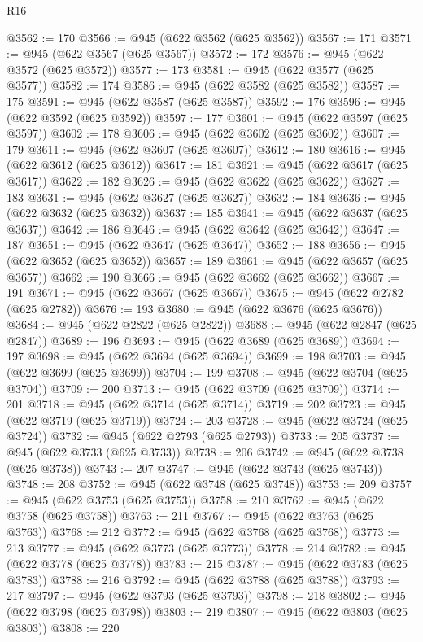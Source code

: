\begin{lexlean}{R16}
\begin{coremodule}
@3562 := 170
@3566 := @945 (@622 @3562 (@625 @3562))
@3567 := 171
@3571 := @945 (@622 @3567 (@625 @3567))
@3572 := 172
@3576 := @945 (@622 @3572 (@625 @3572))
@3577 := 173
@3581 := @945 (@622 @3577 (@625 @3577))
@3582 := 174
@3586 := @945 (@622 @3582 (@625 @3582))
@3587 := 175
@3591 := @945 (@622 @3587 (@625 @3587))
@3592 := 176
@3596 := @945 (@622 @3592 (@625 @3592))
@3597 := 177
@3601 := @945 (@622 @3597 (@625 @3597))
@3602 := 178
@3606 := @945 (@622 @3602 (@625 @3602))
@3607 := 179
@3611 := @945 (@622 @3607 (@625 @3607))
@3612 := 180
@3616 := @945 (@622 @3612 (@625 @3612))
@3617 := 181
@3621 := @945 (@622 @3617 (@625 @3617))
@3622 := 182
@3626 := @945 (@622 @3622 (@625 @3622))
@3627 := 183
@3631 := @945 (@622 @3627 (@625 @3627))
@3632 := 184
@3636 := @945 (@622 @3632 (@625 @3632))
@3637 := 185
@3641 := @945 (@622 @3637 (@625 @3637))
@3642 := 186
@3646 := @945 (@622 @3642 (@625 @3642))
@3647 := 187
@3651 := @945 (@622 @3647 (@625 @3647))
@3652 := 188
@3656 := @945 (@622 @3652 (@625 @3652))
@3657 := 189
@3661 := @945 (@622 @3657 (@625 @3657))
@3662 := 190
@3666 := @945 (@622 @3662 (@625 @3662))
@3667 := 191
@3671 := @945 (@622 @3667 (@625 @3667))
@3675 := @945 (@622 @2782 (@625 @2782))
@3676 := 193
@3680 := @945 (@622 @3676 (@625 @3676))
@3684 := @945 (@622 @2822 (@625 @2822))
@3688 := @945 (@622 @2847 (@625 @2847))
@3689 := 196
@3693 := @945 (@622 @3689 (@625 @3689))
@3694 := 197
@3698 := @945 (@622 @3694 (@625 @3694))
@3699 := 198
@3703 := @945 (@622 @3699 (@625 @3699))
@3704 := 199
@3708 := @945 (@622 @3704 (@625 @3704))
@3709 := 200
@3713 := @945 (@622 @3709 (@625 @3709))
@3714 := 201
@3718 := @945 (@622 @3714 (@625 @3714))
@3719 := 202
@3723 := @945 (@622 @3719 (@625 @3719))
@3724 := 203
@3728 := @945 (@622 @3724 (@625 @3724))
@3732 := @945 (@622 @2793 (@625 @2793))
@3733 := 205
@3737 := @945 (@622 @3733 (@625 @3733))
@3738 := 206
@3742 := @945 (@622 @3738 (@625 @3738))
@3743 := 207
@3747 := @945 (@622 @3743 (@625 @3743))
@3748 := 208
@3752 := @945 (@622 @3748 (@625 @3748))
@3753 := 209
@3757 := @945 (@622 @3753 (@625 @3753))
@3758 := 210
@3762 := @945 (@622 @3758 (@625 @3758))
@3763 := 211
@3767 := @945 (@622 @3763 (@625 @3763))
@3768 := 212
@3772 := @945 (@622 @3768 (@625 @3768))
@3773 := 213
@3777 := @945 (@622 @3773 (@625 @3773))
@3778 := 214
@3782 := @945 (@622 @3778 (@625 @3778))
@3783 := 215
@3787 := @945 (@622 @3783 (@625 @3783))
@3788 := 216
@3792 := @945 (@622 @3788 (@625 @3788))
@3793 := 217
@3797 := @945 (@622 @3793 (@625 @3793))
@3798 := 218
@3802 := @945 (@622 @3798 (@625 @3798))
@3803 := 219
@3807 := @945 (@622 @3803 (@625 @3803))
@3808 := 220

\end{coremodule}
\end{lexlean}
